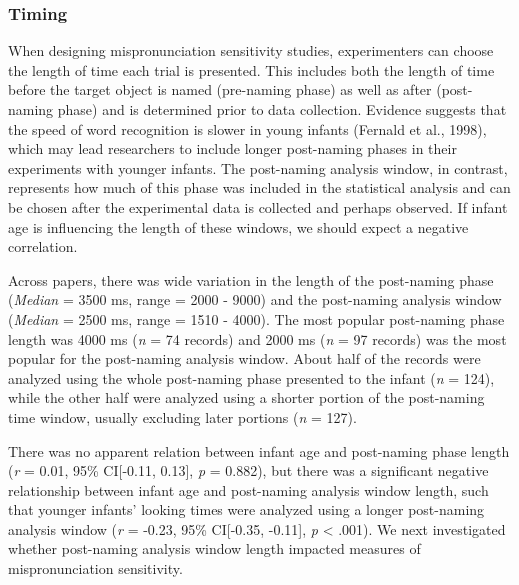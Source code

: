 \documentclass[
  english,
  man, noextraspace]{apa6}
\begin{document}
\hypertarget{timing}{%
\subsubsection{Timing}\label{timing}}

When designing mispronunciation sensitivity studies, experimenters can choose the length of time each trial is presented. This includes both the length of time before the target object is named (pre-naming phase) as well as after (post-naming phase) and is determined prior to data collection. Evidence suggests that the speed of word recognition is slower in young infants (Fernald et al., 1998), which may lead researchers to include longer post-naming phases in their experiments with younger infants. The post-naming analysis window, in contrast, represents how much of this phase was included in the statistical analysis and can be chosen after the experimental data is collected and perhaps observed. If infant age is influencing the length of these windows, we should expect a negative correlation.

Across papers, there was wide variation in the length of the post-naming phase (\emph{Median} = 3500 ms, range = 2000 - 9000) and the post-naming analysis window (\emph{Median} = 2500 ms, range = 1510 - 4000). The most popular post-naming phase length was 4000 ms (\emph{n} = 74 records) and 2000 ms (\emph{n} = 97 records) was the most popular for the post-naming analysis window. About half of the records were analyzed using the whole post-naming phase presented to the infant (\emph{n} = 124), while the other half were analyzed using a shorter portion of the post-naming time window, usually excluding later portions (\emph{n} = 127).

There was no apparent relation between infant age and post-naming phase length (\emph{r} = 0.01, 95\% CI{[}-0.11, 0.13{]}, \emph{p} = 0.882), but there was a significant negative relationship between infant age and post-naming analysis window length, such that younger infants' looking times were analyzed using a longer post-naming analysis window (\emph{r} = -0.23, 95\% CI{[}-0.35, -0.11{]}, \emph{p} \textless{} .001). We next investigated whether post-naming analysis window length impacted measures of mispronunciation sensitivity.
\end{document}
